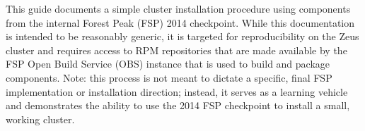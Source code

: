 This guide documents a simple cluster installation procedure using components
from the internal Forest Peak (FSP) 2014 checkpoint. While this documentation
is intended to be reasonably generic, it is targeted for reproducibility on the
Zeus cluster and requires access to RPM repositories that are made
available by the FSP Open Build Service (OBS) instance that is used to build
and package components. Note: this process is not meant to dictate a
specific, final FSP implementation or installation direction; instead, it
serves as a learning vehicle and demonstrates the ability to use the 2014 FSP
checkpoint to install a small, working cluster.
